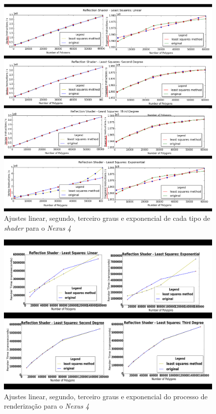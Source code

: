 	\begin{figure}[ht]
	\centering
		\includegraphics[keepaspectratio=true,scale=0.4]{figuras/reflectionlinear.png}
	\caption{Ajustes linear, segundo, terceiro graus e exponencial de cada tipo de \textit{shader} para o \textit{Nexus 4}}
	\label{nexus1_ajuste}
	\end{figure}	

	\begin{figure}[ht]
	\centering
		\includegraphics[keepaspectratio=true,scale=0.4]{figuras/minquad_render_time.png}
	\caption{Ajustes linear, segundo, terceiro graus e exponencial do processo de renderização para o \textit{Nexus 4}}
	\label{nexus2_ajuste}
	\end{figure}	

